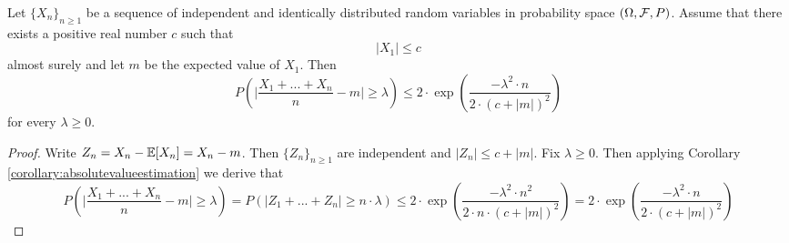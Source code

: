 \begin{corollary}\label{corollary:Hoeffdinginequality}
Let $\{X_n\}_{n\geq 1}$ be a sequence of independent and identically distributed random variables in probability space $\left(\Omega, {\mathcal F},P\right)$. Assume that there exists a positive real number $c$ such that 
$$|X_1|\leq c$$
almost surely and let $m$ be the expected value of $X_1$. Then 
$$P\left(\bigg|\frac{X_1+...+X_n}{n}-m\bigg|\geq \lambda\right)\leq 2\cdot \exp\left(\frac{-\lambda^2\cdot n}{2\cdot (c+|m|)^2}\right)$$
for every $\lambda \geq 0$.
\end{corollary}
\begin{proof}
Write $Z_n = X_n - {\mathbb E} [X_n]= X_n -m$. Then $\{Z_n\}_{n\geq 1}$ are independent and $|Z_n|\leq c+|m|$. Fix $\lambda \geq 0$. Then applying Corollary \ref{corollary:absolutevalueestimation} we derive that
$$P\left(\bigg|\frac{X_1+...+X_n}{n}-m\bigg|\geq \lambda\right)= P\left(|Z_1+...+Z_n|\geq n\cdot \lambda\right)\leq 2\cdot \exp\left(\frac{-\lambda^2\cdot n^2}{2\cdot n\cdot (c+|m|)^2}\right)=2\cdot \exp\left(\frac{-\lambda^2\cdot n}{2\cdot (c+|m|)^2}\right)$$
\end{proof}


























































